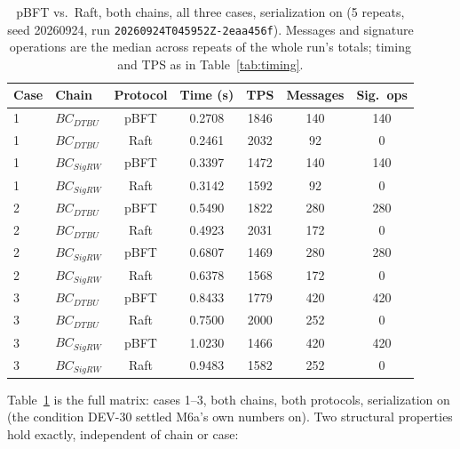 \documentclass[conference]{IEEEtran}
\begin{document}
\begin{table}[t]
\centering
\caption{pBFT vs.\ Raft, both chains, all three cases, serialization on (5 repeats, seed 20260924,
run \texttt{20260924T045952Z-2eaa456f}). Messages and signature operations are the median across
repeats of the whole run's totals; timing and TPS as in Table~\ref{tab:timing}.}
\label{tab:m7-4-matrix}
\footnotesize
\begin{tabular}{llccccc}
\hline
\textbf{Case} & \textbf{Chain} & \textbf{Protocol} & \textbf{Time (s)} & \textbf{TPS} &
\textbf{Messages} & \textbf{Sig.\ ops} \\
\hline
1 & $BC_{DTBU}$  & pBFT & 0.2708 & 1846 & 140 & 140 \\
1 & $BC_{DTBU}$  & Raft & 0.2461 & 2032 &  92 &   0 \\
1 & $BC_{SigRW}$ & pBFT & 0.3397 & 1472 & 140 & 140 \\
1 & $BC_{SigRW}$ & Raft & 0.3142 & 1592 &  92 &   0 \\
2 & $BC_{DTBU}$  & pBFT & 0.5490 & 1822 & 280 & 280 \\
2 & $BC_{DTBU}$  & Raft & 0.4923 & 2031 & 172 &   0 \\
2 & $BC_{SigRW}$ & pBFT & 0.6807 & 1469 & 280 & 280 \\
2 & $BC_{SigRW}$ & Raft & 0.6378 & 1568 & 172 &   0 \\
3 & $BC_{DTBU}$  & pBFT & 0.8433 & 1779 & 420 & 420 \\
3 & $BC_{DTBU}$  & Raft & 0.7500 & 2000 & 252 &   0 \\
3 & $BC_{SigRW}$ & pBFT & 1.0230 & 1466 & 420 & 420 \\
3 & $BC_{SigRW}$ & Raft & 0.9483 & 1582 & 252 &   0 \\
\hline
\end{tabular}
\end{table}

Table~\ref{tab:m7-4-matrix} is the full matrix: cases 1--3, both chains, both protocols,
serialization on (the condition DEV-30 settled M6a's own numbers on). Two structural properties
hold exactly, independent of chain or case:
\end{document}

